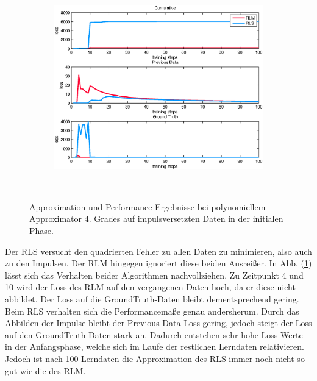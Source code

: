 \documentclass[a4paper, 12pt]{article}
\begin{document}
{\begin{figure}[H]
\begin{subfigure}[b]{0.4\textwidth}
                \includegraphics[width=\textwidth]{./images/copyofstats/impsuperinit(dev5)_perf_100.eps}
                \caption{}
                \label{fig:perf:impinit:perf}
        \end{subfigure}
        \\
        \caption{Approximation und Performance-Ergebnisse bei polynomiellem Approximator 4. Grades auf impulsversetzten Daten in der initialen Phase.}
        \label{fig:perf:impinit}
\end{figure}
Der RLS versucht den quadrierten Fehler zu allen Daten zu minimieren, also auch zu den Impulsen. Der RLM hingegen ignoriert diese beiden Ausreißer. In Abb. (\ref{fig:perf:impinit:perf}) lässt sich das Verhalten beider Algorithmen nachvollziehen.
Zu Zeitpunkt 4 und 10 wird der Loss des RLM auf den vergangenen Daten hoch, da er diese nicht abbildet. Der Loss auf die GroundTruth-Daten bleibt dementsprechend gering. Beim RLS verhalten sich die Performancemaße genau andersherum. Durch das Abbilden der Impulse bleibt der Previous-Data Loss gering, jedoch steigt der Loss auf den GroundTruth-Daten stark an.
Dadurch entstehen sehr hohe Loss-Werte in der Anfangsphase, welche sich im Laufe der restlichen Lerndaten relativieren. Jedoch ist nach 100 Lerndaten die Approximation des RLS immer noch nicht so gut wie die des RLM.

}
\end{document}
